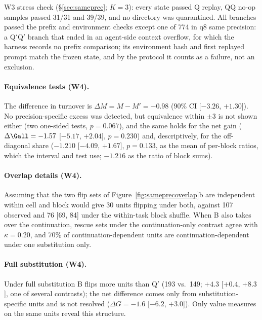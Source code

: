 W3 stress check (\S\ref{sec:sameprec}; $K=3$): every state passed Q replay, QQ no-op samples passed 31/31 and 39/39, and no directory was quarantined. All branches passed the prefix and environment checks except one of 774 in q8 same precision: a Q$'$Q$'$ branch that ended in an agent-side context overflow, for which the harness records no prefix comparison; its environment hash and first replayed prompt match the frozen state, and by the protocol it counts as a failure, not an exclusion. %


\paragraph{Equivalence tests (W4).} The difference in turnover is $\Delta M=M-M'=-0.98$\pp{} (90\% CI [$-3.26$, $+1.30]$). No precision-specific excess was detected, but equivalence within $\pm$3\pp{} is not shown either (two one-sided tests, $p=0.067$), and the same holds for the net gain ($\Delta\Gall=-1.57$ [$-5.17$, $+2.04$], $p=0.230$) and, descriptively, for the off-diagonal share ($-1.210$ [$-4.09$, $+1.67$], $p=0.133$, as the mean of per-block ratios, which the interval and test use; $-1.216$ as the ratio of block sums). %

\paragraph{Overlap details (W4).} Assuming that the two flip sets of Figure~\ref{fig:sameprecoverlap}b are independent within cell and block would give 30 units flipping under both, against 107 observed and 76 [69, 84] under the within-task block shuffle. %
When B also takes over the continuation, rescue sets under the continuation-only contrast agree with $\kappa=0.20$, and 70\% of continuation-dependent units are continuation-dependent under one substitution only. %

\paragraph{Full substitution (W4).} Under full substitution B flips more units than Q$'$ (193 vs.\ 149; $+4.3$ [$+0.4$, $+8.3$]\pp{}, one of several contrasts); the net difference comes only from substitution-specific units and is not resolved ($\Delta G=-1.6$ [$-6.2$, $+3.0$]\pp{}). Only value measures on the same units reveal this structure. %

